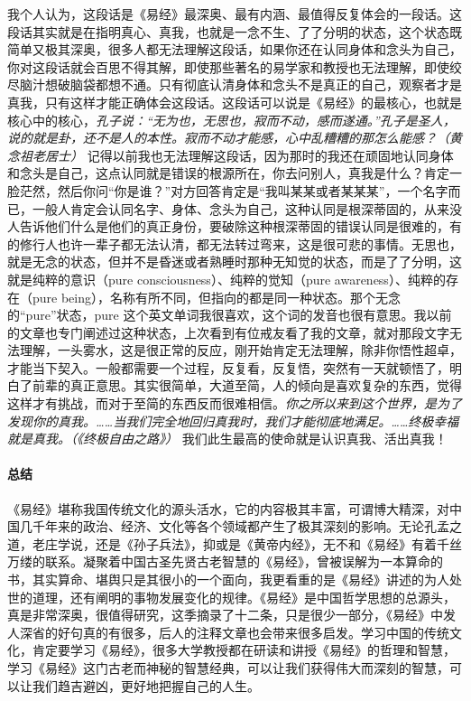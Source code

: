 我个人认为，这段话是《易经》最深奥、最有内涵、最值得反复体会的一段话。这段话其实就是在指明真心、真我，也就是一念不生、了了分明的状态，这个状态既简单又极其深奥，很多人都无法理解这段话，如果你还在认同身体和念头为自己，你对这段话就会百思不得其解，即使那些著名的易学家和教授也无法理解，即使绞尽脑汁想破脑袋都想不通。只有彻底认清身体和念头不是真正的自己，观察者才是真我，只有这样才能正确体会这段话。这段话可以说是《易经》的最核心，也就是核心中的核心，\textit{孔子说：“无为也，无思也，寂而不动，感而遂通。”孔子是圣人，说的就是卦，还不是人的本性。寂而不动才能感，心中乱糟糟的那怎么能感？（黄念祖老居士）} 记得以前我也无法理解这段话，因为那时的我还在顽固地认同身体和念头是自己，这点认同就是错误的根源所在，你去问别人，真我是什么？肯定一脸茫然，然后你问“你是谁？”对方回答肯定是“我叫某某或者某某某”，一个名字而已，一般人肯定会认同名字、身体、念头为自己，这种认同是根深蒂固的，从来没人告诉他们什么是他们的真正身份，要破除这种根深蒂固的错误认同是很难的，有的修行人也许一辈子都无法认清，都无法转过弯来，这是很可悲的事情。无思也，就是无念的状态，但并不是昏迷或者熟睡时那种无知觉的状态，而是了了分明，这就是纯粹的意识（pure consciousness）、纯粹的觉知（pure awareness）、纯粹的存在（pure being），名称有所不同，但指向的都是同一种状态。那个无念的“pure”状态，pure 这个英文单词我很喜欢，这个词的发音也很有意思。我以前的文章也专门阐述过这种状态，上次看到有位戒友看了我的文章，就对那段文字无法理解，一头雾水，这是很正常的反应，刚开始肯定无法理解，除非你悟性超卓，才能当下契入。一般都需要一个过程，反复看，反复悟，突然有一天就顿悟了，明白了前辈的真正意思。其实很简单，大道至简，人的倾向是喜欢复杂的东西，觉得这样才有挑战，而对于至简的东西反而很难相信。\textit{你之所以来到这个世界，是为了发现你的真我。……当我们完全地回归真我时，我们才能彻底地满足。……终极幸福就是真我。（《终极自由之路》）} 我们此生最高的使命就是认识真我、活出真我！

\paragraph*{总结}

《易经》堪称我国传统文化的源头活水，它的内容极其丰富，可谓博大精深，对中国几千年来的政治、经济、文化等各个领域都产生了极其深刻的影响。无论孔孟之道，老庄学说，还是《孙子兵法》，抑或是《黄帝内经》，无不和《易经》有着千丝万缕的联系。凝聚着中国古圣先贤古老智慧的《易经》，曾被误解为一本算命的书，其实算命、堪舆只是其很小的一个面向，我更看重的是《易经》讲述的为人处世的道理，还有阐明的事物发展变化的规律。《易经》是中国哲学思想的总源头，真是非常深奥，很值得研究，这季摘录了十二条，只是很少一部分，《易经》中发人深省的好句真的有很多，后人的注释文章也会带来很多启发。学习中国的传统文化，肯定要学习《易经》，很多大学教授都在研读和讲授《易经》的哲理和智慧，学习《易经》这门古老而神秘的智慧经典，可以让我们获得伟大而深刻的智慧，可以让我们趋吉避凶，更好地把握自己的人生。

